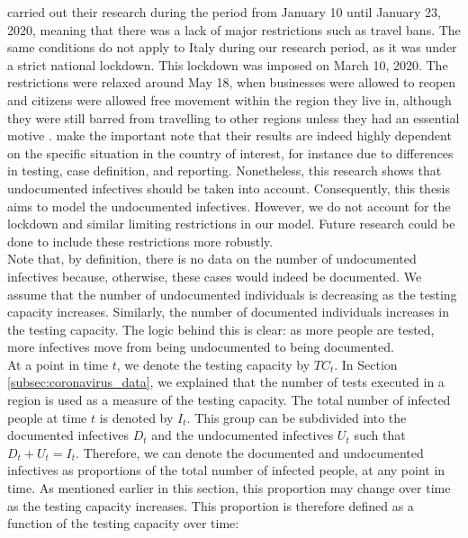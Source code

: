 \documentclass[12pt]{article}
\begin{document}
	\textcite{li2020undocumented} carried out their research during the period from January 10 until January 23, 2020, meaning that there was a lack of major restrictions such as travel bans. The same conditions do not apply to Italy during our research period, as it was under a strict national lockdown. This lockdown was imposed on March 10, 2020. The restrictions were relaxed around May 18, when businesses were allowed to reopen and citizens were allowed free movement within the region they live in, although they were still barred from travelling to other regions unless they had an essential motive \parencite{severgnini2020relaxLockdown}. \textcite{li2020undocumented} make the important note that their results are indeed highly dependent on the specific situation in the country of interest, for instance due to differences in testing, case definition, and reporting. Nonetheless, this research shows that undocumented infectives should be taken into account. Consequently, this thesis aims to model the undocumented infectives. However, we do not account for the lockdown and similar limiting restrictions in our model. Future research could be done to include these restrictions more robustly. \\
	
	Note that, by definition, there is no data on the number of undocumented infectives because, otherwise, these cases would indeed be documented. We assume that the number of undocumented individuals is decreasing as the testing capacity increases. Similarly, the number of documented individuals increases in the testing capacity. The logic behind this is clear: as more people are tested, more infectives move from being undocumented to being documented. \\
	
	At a point in time $t$, we denote the testing capacity by $TC_t$. In Section \ref{subsec:coronavirus_data}, we explained that the number of tests executed in a region is used as a measure of the testing capacity. The total number of infected people at time $t$ is denoted by $I_t$. This group can be subdivided into the documented infectives $D_t$ and the undocumented infectives $U_t$ such that $D_t + U_t = I_t$. Therefore, we can denote the documented and undocumented infectives as proportions of the total number of infected people, at any point in time. As mentioned earlier in this section, this proportion may change over time as the testing capacity increases. This proportion is therefore defined as a function of the testing capacity over time:
	
\end{document}
